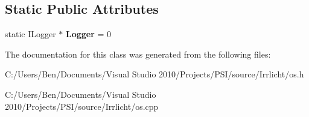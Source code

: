 \subsection*{Static Public Attributes}
\begin{DoxyCompactItemize}
\item 
\hypertarget{classirr_1_1os_1_1_printer_a96df30c2dda6df2cea37e40d7de7e7d7}{static I\-Logger $\ast$ {\bfseries Logger} = 0}\label{classirr_1_1os_1_1_printer_a96df30c2dda6df2cea37e40d7de7e7d7}

\end{DoxyCompactItemize}


The documentation for this class was generated from the following files\-:\begin{DoxyCompactItemize}
\item 
C\-:/\-Users/\-Ben/\-Documents/\-Visual Studio 2010/\-Projects/\-P\-S\-I/source/\-Irrlicht/os.\-h\item 
C\-:/\-Users/\-Ben/\-Documents/\-Visual Studio 2010/\-Projects/\-P\-S\-I/source/\-Irrlicht/os.\-cpp\end{DoxyCompactItemize}
